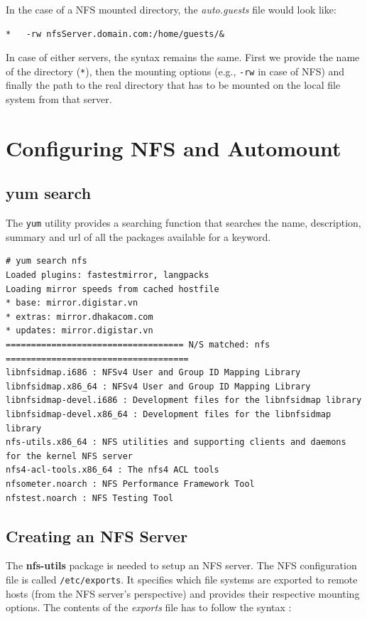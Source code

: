 In the case of a NFS mounted directory, the \textit{auto.guests} file would look like:

\begin{verbatim}
*	-rw	nfsServer.domain.com:/home/guests/&
\end{verbatim}

\noindent
In case of either servers, the syntax remains the same. First we provide the name of the directory (\verb|*|), then the mounting options (e.g., \verb|-rw| in case of NFS) and finally the path to the real directory that has to be mounted on the local file system from that server.

\section{Configuring NFS and Automount}
\subsection{yum search}
\vspace{-10pt}
The \verb|yum| utility provides a searching function that searches the name, description, summary and url of all the packages available for a keyword. 

\vspace{-15pt}
\begin{verbatim}
# yum search nfs
Loaded plugins: fastestmirror, langpacks
Loading mirror speeds from cached hostfile
* base: mirror.digistar.vn
* extras: mirror.dhakacom.com
* updates: mirror.digistar.vn
=================================== N/S matched: nfs ====================================
libnfsidmap.i686 : NFSv4 User and Group ID Mapping Library
libnfsidmap.x86_64 : NFSv4 User and Group ID Mapping Library
libnfsidmap-devel.i686 : Development files for the libnfsidmap library
libnfsidmap-devel.x86_64 : Development files for the libnfsidmap library
nfs-utils.x86_64 : NFS utilities and supporting clients and daemons for the kernel NFS server
nfs4-acl-tools.x86_64 : The nfs4 ACL tools
nfsometer.noarch : NFS Performance Framework Tool
nfstest.noarch : NFS Testing Tool
\end{verbatim}

\subsection{Creating an NFS Server}
The \textbf{nfs-utils} package is needed to setup an NFS server. The NFS configuration file is called \verb|/etc/exports|. It specifies which file systems are exported to remote hosts (from the NFS server's perspective) and provides their respective mounting options. The contents of the \textit{exports} file has to follow the syntax : 

